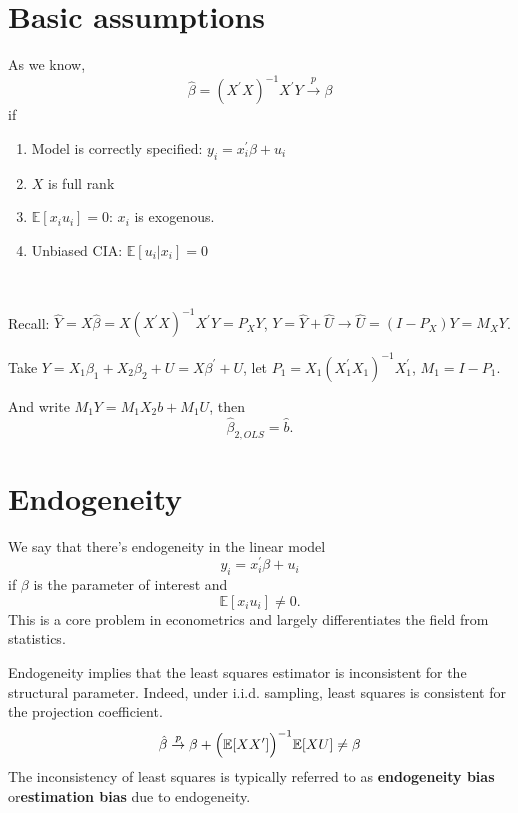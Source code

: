 \section{Basic assumptions}
\label{sec:basic-assumptions}

As we know, \[
    \hat{\beta} = (X^{\prime} X)^{-1}X^{\prime} Y \overset{p}{\to} \beta
\]
if
\begin{enumerate}
    \item Model is correctly specified: $y_i = x_i^{\prime} \beta + u_i$
    \item $X$ is full rank
    \item $\mathbb{E}[x_i u_i] = 0$: $x_i$ is exogenous.
    \item Unbiased CIA: $\mathbb{E}[u_i|x_i] = 0$
\end{enumerate}

\begin{theorem}
    \label{thm:FWL}
    \ 

    Recall: $\hat{Y} = X \hat{\beta} = X(X^{\prime} X)^{-1}X^{\prime} Y = P_X Y$, $Y = \hat{Y} + \hat{U} \rightarrow \hat{U} = (I - P_X)Y = M_X Y$.

    Take $Y = X_1 \beta_1 + X_2 \beta_2 + U = X \beta ^{\prime} +U$,
    let $P_1 = X_1 (X_1^{\prime} X_1)^{-1}X_1^{\prime} $, $M_1 = I - P_1$.

    And write $M_1 Y = M_1 X_2 b + M_1 U$, then
    \[\hat{\beta}_{2, OLS} = \hat{b}.\]
\end{theorem}

\section{Endogeneity}
\label{sec:endogeneity}

We say that there's endogeneity in the linear model
\[y_i = x_i^{\prime} \beta + u_i\]
if $\beta$ is the parameter of interest and
\[\mathbb{E}[x_i u_i] \neq 0.\]
This is a core problem in econometrics and largely differentiates the field from statistics.

Endogeneity implies that the least squares estimator is inconsistent for the structural parameter.
Indeed, under i.i.d. sampling, least squares is consistent for the projection coefficient.
\begin{gather*}
    \hat{\beta} \overset{p}{\rightarrow} \beta + \Bigl(\mathbb{E}[X X^{\prime}] \Bigr)^{-1} \mathbb{E}[X U] \neq \beta 
\end{gather*}
The inconsistency of least squares is typically referred to as \textbf{endogeneity bias} or\textbf{estimation bias} due to
endogeneity.

